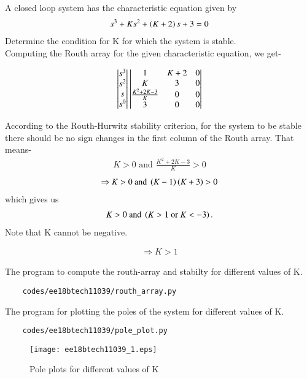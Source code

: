 \begin{enumerate}[label=\thesubsection.\arabic*.,ref=\thesubsection.\theenumi]

A closed loop system has the characteristic equation given by \begin{align} s^3+Ks^2+\left(K+2\right)s+3 = 0 \end{align}Determine the condition for K for which the system is stable.\\
\solution
Computing the Routh array for the given characteristic equation, we get-

\begin{align}
    \begin{vmatrix}s^3 \\ s^2 \\ s \\ s^0\end{vmatrix} 
    \begin{vmatrix}1 & K+2 & 0 \\ K & 3 & 0 \\ \frac{K^2+2K-3}{K} & 0 & 0 \\ 3 & 0 & 0\end{vmatrix}
\end{align}

According to the Routh-Hurwitz stability criterion, for the system to be stable there should be no sign changes in the first column of the Routh array. That means-
\begin{align}
    K > 0 \text{ and } \frac{K^2+2K-3}{K} > 0 
\end{align}
\begin{align}
\Rightarrow K > 0 \text{ and } \left(K-1\right)\left(K+3\right) > 0 
\end{align}
which gives us 
\begin{align}
    K > 0 \text{ and } \left(K > 1 \text{ or } K < -3\right).
\end{align}
Note that K cannot be negative.

\begin{align}
\Rightarrow K > 1 
\end{align}

The program to compute the routh-array and stabilty for different values of K.
\begin{lstlisting}
    codes/ee18btech11039/routh_array.py
\end{lstlisting}

The program for plotting the poles of the system for different values of K.
\begin{lstlisting}
    codes/ee18btech11039/pole_plot.py
\end{lstlisting}

\begin{figure}[!ht]
\begin{center}
\texttt{[image: ee18btech11039\_1.eps]}
\caption{Pole plots for different values of K}
\end{center}
\label{fig:ee18btech11039_1}
\end{figure}


\end{enumerate}
